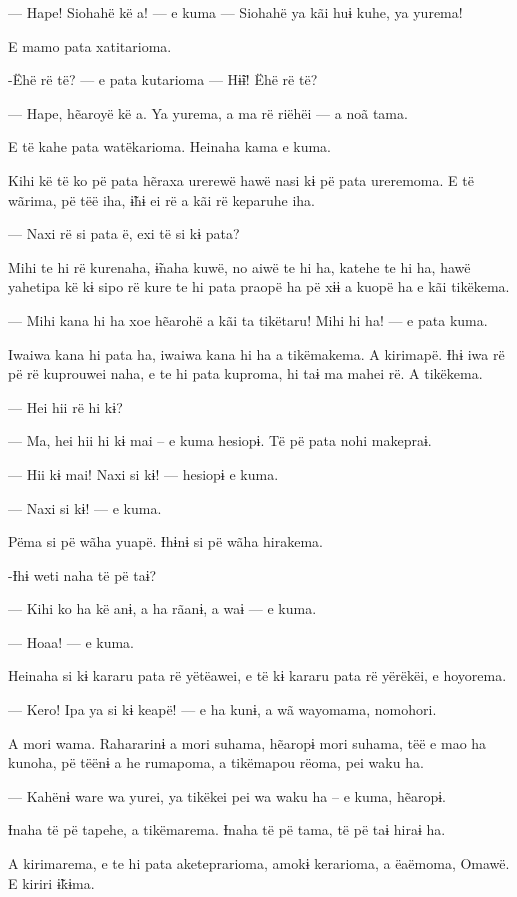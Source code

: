--- Hape! Siohahë kë a! --- e kuma --- Siohahë ya kãi huɨ kuhe, ya yurema! 

E mamo pata xatitarioma. 

-Ëhë rë të? --- e pata kutarioma --- Hɨ̃ɨ! Ëhë rë të? 

--- Hape, hẽaroyë kë a. Ya yurema, a ma rë riëhëi --- a noã tama. 

E të kahe pata watëkarioma. Heinaha kama e kuma. 

Kihi kë të ko pë pata hẽraxa urerewë hawë nasi kɨ pë pata ureremoma. E të wãrima, pë tëë iha, ɨ̃hɨ ei rë a kãi rë keparuhe iha. 

--- Naxi rë si pata ë, exi të si kɨ pata? 

Mihi te hi rë kurenaha, ɨ̃naha kuwë, no aiwë te hi ha, katehe te hi ha,
hawë yahetipa kë kɨ sipo rë kure te hi pata praopë ha pë xɨɨ a kuopë ha
e kãi tikëkema. 

--- Mihi kana hi ha xoe hẽarohë a kãi ta tikëtaru! Mihi hi ha! --- e pata
kuma. 

Iwaiwa kana hi pata ha, iwaiwa kana hi ha a tikëmakema. A kirimapë. Ɨhɨ
iwa rë pë rë kuprouwei naha, e te hi pata kuproma, hi taɨ ma mahei rë. A tikëkema. 

--- Hei hii rë hi kɨ? 

--- Ma, hei hii hi kɨ mai -- e kuma hesiopɨ. Të pë pata nohi makepraɨ. 

--- Hii kɨ mai! Naxi si kɨ! --- hesiopɨ e kuma. 

--- Naxi si kɨ! --- e kuma. 

Pëma si pë wãha yuapë. Ɨhɨnɨ si pë wãha hirakema. 

-Ɨhɨ weti naha të pë taɨ? 

--- Kihi ko ha kë anɨ, a ha rãanɨ, a waɨ --- e kuma. 

--- Hoaa! --- e kuma. 

Heinaha si kɨ kararu pata rë yëtëawei, e të kɨ kararu pata rë yërëkëi, e
hoyorema. 

--- Kero! Ipa ya si kɨ keapë! --- e ha kunɨ, a wã wayomama, nomohori. 

A mori wama. Rahararinɨ a mori suhama, hẽaropɨ mori suhama, tëë e mao ha
kunoha, pë tëënɨ a he rumapoma, a tikëmapou rëoma, pei waku ha. 

--- Kahënɨ ware wa yurei, ya tikëkei pei wa waku ha -- e kuma, hẽaropɨ.

Ɨnaha të pë tapehe, a tikëmarema. Ɨnaha të pë tama, të pë taɨ hiraɨ ha. 

A kirimarema, e te hi pata aketeprarioma, amokɨ kerarioma, a ëaëmoma,
Omawë. E kiriri ɨ̃kɨma. 

